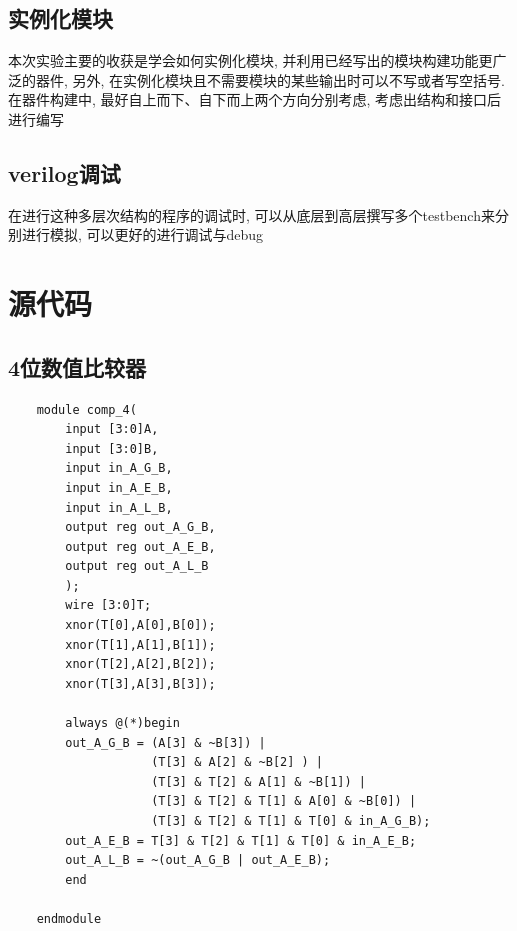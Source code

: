 \documentclass[fontset=windows,12pt]{article}
\begin{document}
    \subsection{实例化模块}
        本次实验主要的收获是学会如何实例化模块, 并利用已经写出的模块构建功能更广泛的器件, 另外, 在实例化模块且不需要模块的某些输出时可以不写或者写空括号.
        在器件构建中, 最好自上而下、自下而上两个方向分别考虑, 考虑出结构和接口后进行编写
    \subsection{verilog调试}
        在进行这种多层次结构的程序的调试时, 可以从底层到高层撰写多个testbench来分别进行模拟, 可以更好的进行调试与debug


\section{源代码}
    \subsection{4位数值比较器}
    {\setmainfont{Courier New Bold} 
    \begin{lstlisting}
    module comp_4(
        input [3:0]A,
        input [3:0]B,
        input in_A_G_B,
        input in_A_E_B,
        input in_A_L_B,
        output reg out_A_G_B,
        output reg out_A_E_B,
        output reg out_A_L_B
        );
        wire [3:0]T;
        xnor(T[0],A[0],B[0]);
        xnor(T[1],A[1],B[1]);
        xnor(T[2],A[2],B[2]);
        xnor(T[3],A[3],B[3]);
        
        always @(*)begin
        out_A_G_B = (A[3] & ~B[3]) | 
                    (T[3] & A[2] & ~B[2] ) | 
                    (T[3] & T[2] & A[1] & ~B[1]) | 
                    (T[3] & T[2] & T[1] & A[0] & ~B[0]) | 
                    (T[3] & T[2] & T[1] & T[0] & in_A_G_B);
        out_A_E_B = T[3] & T[2] & T[1] & T[0] & in_A_E_B;
        out_A_L_B = ~(out_A_G_B | out_A_E_B);
        end
        
    endmodule
    \end{lstlisting}}
\end{document}

